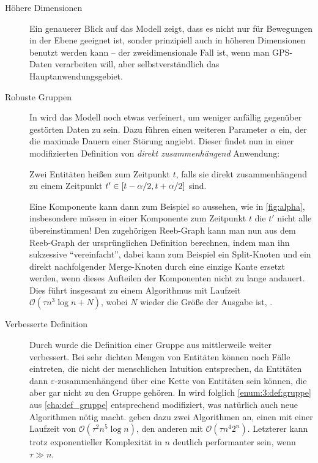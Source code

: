 \begin{description}
    \item[Höhere Dimensionen] Ein genauerer Blick auf das Modell zeigt, dass es nicht nur für Bewegungen in der Ebene geeignet ist, sonder prinzipiell auch in höheren Dimensionen benutzt werden kann -- der zweidimensionale Fall ist, wenn man GPS-Daten verarbeiten will, aber selbstverständlich das Hauptanwendungsgebiet.
    \item[Robuste Gruppen] In \textcite[Sec.~4]{buchin2015} wird das Modell noch etwas verfeinert, um weniger anfällig gegenüber gestörten Daten zu sein.
    Dazu führen \textcite{buchin2015} einen weiteren Parameter $\alpha$ ein, der die maximale Dauern einer Störung angiebt.
    Dieser findet nun in einer modifizierten Definition von \emph{direkt zusammenhängend} Anwendung:
    
    \begin{definition}
        Zwei Entitäten heißen  zum Zeitpunkt $t$, falls sie direkt zusammenhängend zu einem Zeitpunkt $t' \in \benbrace*{t- \alpha/2, t+ \alpha/2}$ sind.
    \end{definition}
    
    Eine Komponente kann dann zum Beispiel so aussehen, wie in \cref{fig:alpha}, insbesondere müssen in einer Komponente zum Zeitpunkt $t$ die $t'$ nicht alle übereinstimmen!
    Den zugehörigen Reeb-Graph kann man nun aus dem Reeb-Graph der ursprünglichen Definition berechnen, indem man ihn sukzessive \enquote{vereinfacht}, dabei kann zum Beispiel ein Split-Knoten und ein direkt nachfolgender Merge-Knoten durch eine einzige Kante ersetzt werden, wenn dieses Aufteilen der Komponenten nicht zu lange andauert.
    Dies führt insgesamt zu einem Algorithmus mit Laufzeit $\mathcal{O}(\tau n^3 \log n + N)$, wobei $N$ wieder die Größe der Ausgabe ist, \cite[Thm.~13]{buchin2015}.
    \item[Verbesserte Definition] Durch \textcite{grouping_improved} wurde die Definition einer Gruppe aus \textcite{buchin2015} mittlerweile weiter verbessert.
    Bei sehr dichten Mengen von Entitäten können noch Fälle eintreten, die nicht der menschlichen Intuition entsprechen, da Entitäten dann $\varepsilon$-zusammenhängend über eine Kette von Entitäten sein können, die aber gar nicht zu den Gruppe gehören.
    In \textcite{grouping_improved} wird folglich \cref{enum:3:def:gruppe} aus \cref{cha:def_gruppe} entsprechend modifiziert, was natürlich auch neue Algorithmen nötig macht.
    \textcite{grouping_improved} geben dazu zwei Algorithmen an, einen mit einer Laufzeit von $\mathcal{O}(\tau^2 n^5 \log n)$, den anderen mit $\mathcal{O}(\tau n^4 2^n)$.
    Letzterer kann trotz exponentieller Komplexität in $n$ deutlich performanter sein, wenn $\tau \gg n$.
\end{description}

